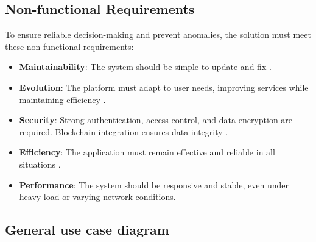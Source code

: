 \subsection{Non-functional Requirements}

To ensure reliable decision-making and prevent anomalies, the solution must meet these non-functional requirements:
\begin{itemize}
    \item \textbf{Maintainability}: The system should be simple to update and fix \cite{DevOpsFoundation2023, FowlerRefactoring2018}.
    \item \textbf{Evolution}: The platform must adapt to user needs, improving services while maintaining efficiency \cite{PoppendieckLean2012, KnibergLeanStartup2013}.
    \item \textbf{Security}: Strong authentication, access control, and data encryption are required. Blockchain integration ensures data integrity \cite{WangBlockchainRealEstate2023}.
    \item \textbf{Efficiency}: The application must remain effective and reliable in all situations \cite{KimDevOpsMethods2018, BassArchitecture2021}.
    \item \textbf{Performance}: The system should be responsive and stable, even under heavy load or varying network conditions.
\end{itemize}



\subsection*{General use case diagram}

